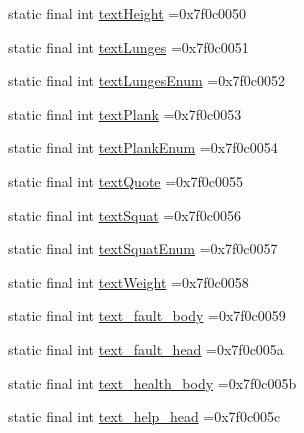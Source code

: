 \begin{DoxyCompactItemize}
static final int \mbox{\hyperlink{classcom_1_1example_1_1trainawearapplication_1_1_r_1_1string_a49721e38b5f488b97e1dd7870852de69}{text\+Height}} =0x7f0c0050
\item 
static final int \mbox{\hyperlink{classcom_1_1example_1_1trainawearapplication_1_1_r_1_1string_a043d982634ca501e35babf7874653260}{text\+Lunges}} =0x7f0c0051
\item 
static final int \mbox{\hyperlink{classcom_1_1example_1_1trainawearapplication_1_1_r_1_1string_a8116beac4cb6e26d4b20ae2bb864cafb}{text\+Lunges\+Enum}} =0x7f0c0052
\item 
static final int \mbox{\hyperlink{classcom_1_1example_1_1trainawearapplication_1_1_r_1_1string_a66955d348d48ffe12771f7d52108943a}{text\+Plank}} =0x7f0c0053
\item 
static final int \mbox{\hyperlink{classcom_1_1example_1_1trainawearapplication_1_1_r_1_1string_adf29c9a0f9c606057258fd14f1874855}{text\+Plank\+Enum}} =0x7f0c0054
\item 
static final int \mbox{\hyperlink{classcom_1_1example_1_1trainawearapplication_1_1_r_1_1string_a6ad88dee3572a4e483a7ee9fccaff94e}{text\+Quote}} =0x7f0c0055
\item 
static final int \mbox{\hyperlink{classcom_1_1example_1_1trainawearapplication_1_1_r_1_1string_a384950327980583cc3758a21ee0ebf14}{text\+Squat}} =0x7f0c0056
\item 
static final int \mbox{\hyperlink{classcom_1_1example_1_1trainawearapplication_1_1_r_1_1string_a0cba505d1bf2624321c90d9758c7b025}{text\+Squat\+Enum}} =0x7f0c0057
\item 
static final int \mbox{\hyperlink{classcom_1_1example_1_1trainawearapplication_1_1_r_1_1string_a63ba304b5e5ae14d92cede7f9ba46f2a}{text\+Weight}} =0x7f0c0058
\item 
static final int \mbox{\hyperlink{classcom_1_1example_1_1trainawearapplication_1_1_r_1_1string_af9fa67aadee4239f68aff09dd4b17eb3}{text\+\_\+fault\+\_\+body}} =0x7f0c0059
\item 
static final int \mbox{\hyperlink{classcom_1_1example_1_1trainawearapplication_1_1_r_1_1string_a153412935561036ec17a951c77a9468b}{text\+\_\+fault\+\_\+head}} =0x7f0c005a
\item 
static final int \mbox{\hyperlink{classcom_1_1example_1_1trainawearapplication_1_1_r_1_1string_a9ac2630a747b4da4ea4c6d1626e062c5}{text\+\_\+health\+\_\+body}} =0x7f0c005b
\item 
static final int \mbox{\hyperlink{classcom_1_1example_1_1trainawearapplication_1_1_r_1_1string_a07955e072e72930b56df132fc8263526}{text\+\_\+help\+\_\+head}} =0x7f0c005c

\end{DoxyCompactItemize}

